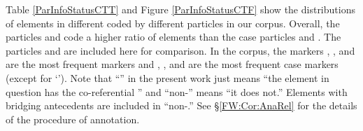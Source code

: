 Table \ref{ParInfoStatusCTT} and Figure \ref{ParInfoStatusCTF} show the distributions of elements in different  coded by different particles in our corpus.
Overall, the  particles  and  code a higher ratio of  elements than the case particles  and .
The particles  and  are included here for comparison.
In the corpus, the markers , , and  are the most frequent  markers and 
, , and  are the most frequent case markers (except for  `').
Note that ``'' in the present work just means ``the element in question has the co-referential '' and ``non-'' means ``it does not.''
Elements with bridging antecedents are included in ``non-.''
See \S \ref{FW:Cor:AnaRel} for the details of the procedure of annotation.
